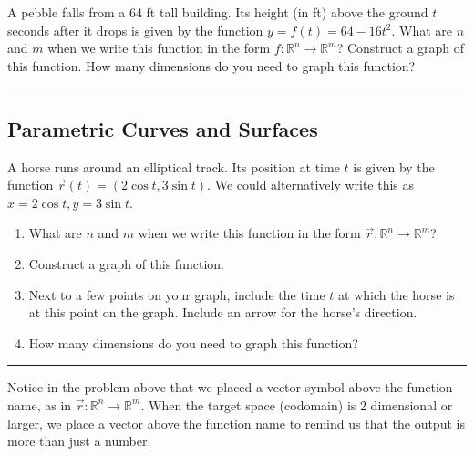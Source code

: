 \begin{problem}\label{pebble problem}%
A pebble falls from a 64 ft tall building.  Its height (in ft) above the ground $t$ seconds after it drops is given by the function $y=f(t)=64-16t^2$. What are $n$ and $m$ when we write this function in the form  $f:{\mathbb{R}}^n\to {\mathbb{R}}^m$? Construct a graph of this function.  How many dimensions do you need to graph this function?
\hrule\end{problem}

\subsection{Parametric Curves and Surfaces}

\begin{problem}\label{parametric curve in plane example}%
%
A horse runs around an elliptical track. Its position at time $t$ is given by the function $\vec r(t)=(2\cos t, 3\sin t).$ We could alternatively write this as $x=2\cos t, y=3\sin t$. 
 \begin{enumerate}
  \item What are $n$ and $m$ when we write this function in the form  $\vec r:{\mathbb{R}}^n\to {\mathbb{R}}^m$?
  \item Construct a graph of this function. 
  \item Next to a few points on your graph, include the time $t$ at which the horse is at this point on the graph. Include an arrow for the horse's direction.
  \item How many dimensions do you need to graph this function?
 \end{enumerate}
\hrule\end{problem}


\begin{remark}
Notice in the problem above that we placed a vector symbol above the function name, as in $\vec r:{\mathbb{R}}^n\to {\mathbb{R}}^m$.  When the target space (codomain) is 2 dimensional or larger, we place a vector above the function name to remind us that the output is more than just a number.
\end{remark}

